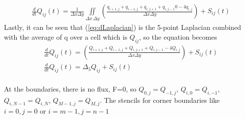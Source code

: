 \begin{enumerate}
	\begin{align}
		& \frac{d}{dt} Q_{ij}(t) = \frac{1}{\Delta x \Delta y} \iint \limits_{\Delta x \, \Delta y} \left( \frac{ q_{i+1,j} +q_{i-1,j} +q_{i,j+1} + q_{i,j-1}0 -4q_{i,j} }{\Delta x \Delta y} \right) + S_{ij}(t) \label{eq:dLaplacian} 
	\end{align}
	Lastly, it can be seen that (\ref{eq:dLaplacian}) is the 5-point Laplacian combined with the average of q over a cell which is $Q_{ij}$, so the equation becomes 
	\begin{align*}
		& \frac{d}{dt} Q_{ij}(t) = \left( \frac{ Q_{i+1,j} +Q_{i-1,j} +Q_{i,j+1} + Q_{i,j-1} -4Q_{i,j} }{\Delta x \Delta y} \right) + S_{ij}(t) \\
		& \frac{d}{dt} Q_{ij}(t) = \Delta_5 Q_{ij} + S_{ij}(t) 
	\end{align*}
	\\
	At the boundaries, there is no flux, F=0, so $Q_{0,j}=Q_{-1,j}$, $Q_{i,0}=Q_{i,-1}$, $Q_{i,N-1}=Q_{i,N}$, $Q_{M-1,j}=Q_{M,j}$. The stencils for corner boundaries like $i=0,j=0$ or $i=m-1,j=n-1$
	

\end{enumerate}
